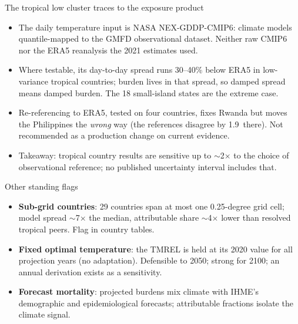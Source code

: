 \documentclass[aspectratio=169,11pt]{beamer}
\begin{document}
\begin{frame}{The tropical low cluster traces to the exposure product}
  \begin{itemize}
    \item The daily temperature input is NASA NEX-GDDP-CMIP6: climate models
      quantile-mapped to the GMFD observational dataset. Neither raw CMIP6
      nor the ERA5 reanalysis the 2021 estimates used.
    \item Where testable, its day-to-day spread runs 30--40\% below ERA5 in
      low-variance tropical countries; burden lives in that spread, so
      damped spread means damped burden. The 18 small-island states are the
      extreme case.
    \item Re-referencing to ERA5, tested on four countries, fixes Rwanda but
      moves the Philippines the \emph{wrong} way (the references disagree by
      1.9\,\textcelsius{} there). \alert{Not recommended as a production
      change on current evidence.}
    \item Takeaway: tropical country results are sensitive up to
      \(\sim\)2\(\times\) to the choice of observational reference; no
      published uncertainty interval includes that.
  \end{itemize}
\end{frame}

\begin{frame}{Other standing flags}
  \begin{itemize}
    \item \textbf{Sub-grid countries}: 29 countries span at most one
      0.25-degree grid cell; model spread \(\sim\)7\(\times\) the median,
      attributable share \(\sim\)4\(\times\) lower than resolved tropical
      peers. Flag in country tables.
    \item \textbf{Fixed optimal temperature}: the TMREL is held at its 2020
      value for all projection years (no adaptation). Defensible to 2050;
      strong for 2100; an annual derivation exists as a sensitivity.
    \item \textbf{Forecast mortality}: projected burdens mix climate with
      IHME's demographic and epidemiological forecasts; attributable
      fractions isolate the climate signal.
  \end{itemize}
\end{frame}

\end{document}
